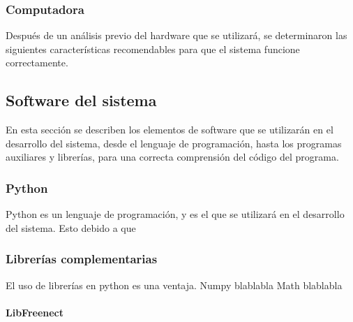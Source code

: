 \documentclass[a4paper,openright,12pt]{report}
\begin{document}
\subsubsection{Computadora}
Después de un análisis previo del hardware que se utilizará, se determinaron las siguientes características recomendables para que el sistema funcione correctamente.
 

\subsection{Software del sistema}
En esta sección se describen los elementos de software que se utilizarán en el desarrollo del sistema, desde el lenguaje de programación, hasta los programas auxiliares y librerías, para una correcta comprensión del código del programa.
\subsubsection{Python}
Python es un lenguaje de programación, y es el que se utilizará en el desarrollo del sistema. Esto debido a que 
\subsubsection{Librerías complementarias}
El uso de librerías en python es una ventaja.
Numpy blablabla
Math blablabla
\paragraph{LibFreenect}
\end{document}
